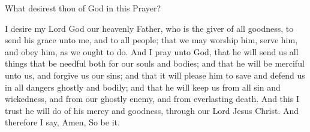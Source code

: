 \centerline{}

 What desirest thou of God in this Prayer?

 I desire my Lord God our heavenly Father, who is the giver of all goodness, to send his grace unto me, and to all people; that we may worship him, serve him, and obey him, as we ought to do. And I pray unto God, that he will send us all things that be needful both for our souls and bodies; and that he will be merciful unto us, and forgive us our sins; and that it will please him to save and defend us in all dangers ghostly and bodily; and that he will keep us from all sin and wickedness, and from our ghostly enemy, and from everlasting death. And this I trust he will do of his mercy and goodness, through our Lord Jesus Christ. And therefore I say, Amen, So be it.











